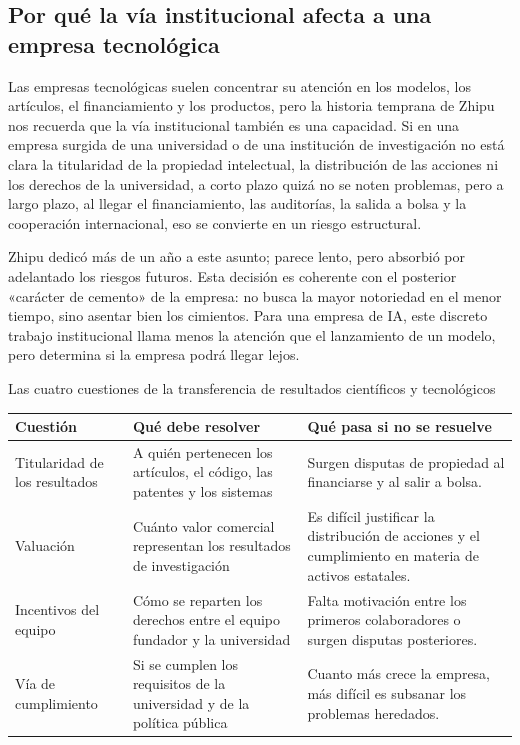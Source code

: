 \subsection{Por qué la vía institucional afecta a una empresa tecnológica}

Las empresas tecnológicas suelen concentrar su atención en los modelos, los artículos, el financiamiento y los productos, pero la historia temprana de Zhipu nos recuerda que la vía institucional también es una capacidad. Si en una empresa surgida de una universidad o de una institución de investigación no está clara la titularidad de la propiedad intelectual, la distribución de las acciones ni los derechos de la universidad, a corto plazo quizá no se noten problemas, pero a largo plazo, al llegar el financiamiento, las auditorías, la salida a bolsa y la cooperación internacional, eso se convierte en un riesgo estructural.

Zhipu dedicó más de un año a este asunto; parece lento, pero absorbió por adelantado los riesgos futuros. Esta decisión es coherente con el posterior «carácter de cemento» de la empresa: no busca la mayor notoriedad en el menor tiempo, sino asentar bien los cimientos. Para una empresa de IA, este discreto trabajo institucional llama menos la atención que el lanzamiento de un modelo, pero determina si la empresa podrá llegar lejos.

\begin{knowledgebox}{Las cuatro cuestiones de la transferencia de resultados científicos y tecnológicos}
\begin{tabularx}{\textwidth}{p{}p{}X}
\toprule
Cuestión & Qué debe resolver & Qué pasa si no se resuelve \\
\midrule
Titularidad de los resultados & A quién pertenecen los artículos, el código, las patentes y los sistemas & Surgen disputas de propiedad al financiarse y al salir a bolsa. \\
Valuación & Cuánto valor comercial representan los resultados de investigación & Es difícil justificar la distribución de acciones y el cumplimiento en materia de activos estatales. \\
Incentivos del equipo & Cómo se reparten los derechos entre el equipo fundador y la universidad & Falta motivación entre los primeros colaboradores o surgen disputas posteriores. \\
Vía de cumplimiento & Si se cumplen los requisitos de la universidad y de la política pública & Cuanto más crece la empresa, más difícil es subsanar los problemas heredados. \\
\bottomrule
\end{tabularx}
\end{knowledgebox}

